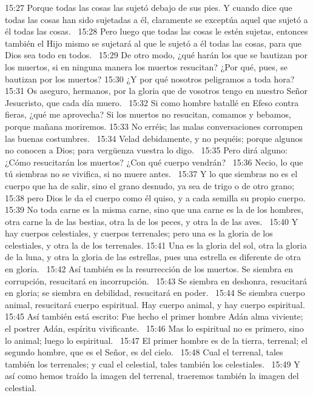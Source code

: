15:27 Porque todas las cosas las sujetó debajo de sus pies. Y cuando dice que todas las cosas han sido sujetadas a él, claramente se exceptúa aquel que sujetó a él todas las cosas.  
15:28 Pero luego que todas las cosas le estén sujetas, entonces también el Hijo mismo se sujetará al que le sujetó a él todas las cosas, para que Dios sea todo en todos.  
15:29 De otro modo, ¿qué harán los que se bautizan por los muertos, si en ninguna manera los muertos resucitan? ¿Por qué, pues, se bautizan por los muertos? 
15:30 ¿Y por qué nosotros peligramos a toda hora?  
15:31 Os aseguro, hermanos, por la gloria que de vosotros tengo en nuestro Señor Jesucristo, que cada día muero.  
15:32 Si como hombre batallé en Efeso contra fieras, ¿qué me aprovecha? Si los muertos no resucitan, comamos y bebamos, porque mañana moriremos. 
15:33 No erréis; las malas conversaciones corrompen las buenas costumbres.  
15:34 Velad debidamente, y no pequéis; porque algunos no conocen a Dios; para vergüenza vuestra lo digo.  
15:35 Pero dirá alguno: ¿Cómo resucitarán los muertos? ¿Con qué cuerpo vendrán?  
15:36 Necio, lo que tú siembras no se vivifica, si no muere antes.  
15:37 Y lo que siembras no es el cuerpo que ha de salir, sino el grano desnudo, ya sea de trigo o de otro grano;  
15:38 pero Dios le da el cuerpo como él quiso, y a cada semilla su propio cuerpo.  
15:39 No toda carne es la misma carne, sino que una carne es la de los hombres, otra carne la de las bestias, otra la de los peces, y otra la de las aves.  
15:40 Y hay cuerpos celestiales, y cuerpos terrenales; pero una es la gloria de los celestiales, y otra la de los terrenales. 
15:41 Una es la gloria del sol, otra la gloria de la luna, y otra la gloria de las estrellas, pues una estrella es diferente de otra en gloria.  
15:42 Así también es la resurrección de los muertos. Se siembra en corrupción, resucitará en incorrupción.  
15:43 Se siembra en deshonra, resucitará en gloria; se siembra en debilidad, resucitará en poder.  
15:44 Se siembra cuerpo animal, resucitará cuerpo espiritual. Hay cuerpo animal, y hay cuerpo espiritual.  
15:45 Así también está escrito: Fue hecho el primer hombre Adán alma viviente; el postrer Adán, espíritu vivificante.  
15:46 Mas lo espiritual no es primero, sino lo animal; luego lo espiritual.  
15:47 El primer hombre es de la tierra, terrenal; el segundo hombre, que es el Señor, es del cielo.  
15:48 Cual el terrenal, tales también los terrenales; y cual el celestial, tales también los celestiales.  
15:49 Y así como hemos traído la imagen del terrenal, traeremos también la imagen del celestial.  
